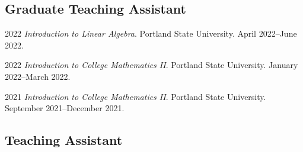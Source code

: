 \documentclass[12pt,letterpaper]{report}
\begin{document}
    \subsection*{Graduate Teaching Assistant}

    \begin{tablist}

        \item[2022] \tab \emph{Introduction to Linear Algebra}. Portland State University. April 2022--June 2022.

        \item[2022] \tab \emph{Introduction to College Mathematics II}. Portland State University. January 2022--March 2022.

        \item[2021] \tab \emph{Introduction to College Mathematics II}. Portland State University. September 2021--December 2021. 
    
    \end{tablist}

    \subsection*{Teaching Assistant}
\end{document}
